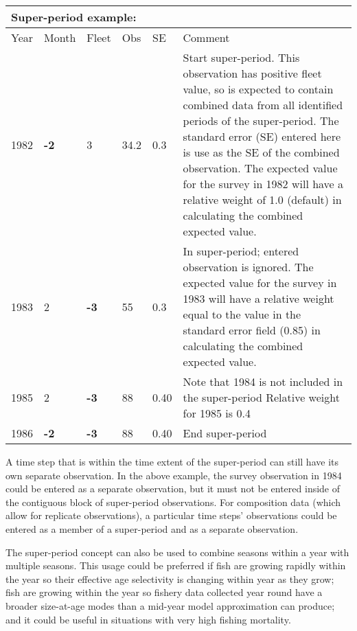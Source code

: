 \begin{center}
	\begin{tabular}{p{1cm} p{1cm} p{1cm} p{1cm} p{1cm} p{9cm}}
		\multicolumn{6}{l}{Super-period example:}\\
		\hline
		Year & Month & Fleet & Obs & SE & Comment \Tstrut\Bstrut\\
		\hline
		1982 \Tstrut & \textbf{-2} & 3 & 34.2 & 0.3 & Start super-period.  This observation has positive fleet value, so is expected to contain combined data from all identified periods of the super-period. The standard error (SE) entered here is use as the SE of the combined observation.  The expected value for the survey in 1982 will have a relative weight of 1.0 (default) in calculating the combined expected value.\Bstrut\\
		\hline
		1983 \Tstrut & 2 & \textbf{-3} & 55 & 0.3 & In super-period; entered observation is ignored.  The expected value for the survey in 1983 will have a relative weight equal to the value in the standard error field (0.85) in calculating the combined expected value.\Bstrut\\
		\hline
		1985 \Tstrut & 2 & \textbf{-3}& 88 & 0.40 & Note that 1984 is not included in the super-period  Relative weight for 1985 is 0.4\Bstrut\\
		\hline
		1986 & \textbf{-2} & \textbf{-3} & 88 & 0.40 & End super-period\Tstrut\Bstrut\\
		\hline
	\end{tabular}
\end{center}

A time step that is within the time extent of the super-period can still have its own separate observation. In the above example, the survey observation in 1984 could be entered as a separate observation, but it must not be entered inside of the contiguous block of super-period observations. For composition data (which allow for replicate observations), a particular time steps' observations could be entered as a member of a super-period and as a separate observation.

The super-period concept can also be used to combine seasons within a year with multiple seasons. This usage could be preferred if fish are growing rapidly within the year so their effective age selectivity is changing within year as they grow; fish are growing within the year so fishery data collected year round have a broader size-at-age modes than a mid-year model approximation can produce; and it could be useful in situations with very high fishing mortality.

\pagebreak
